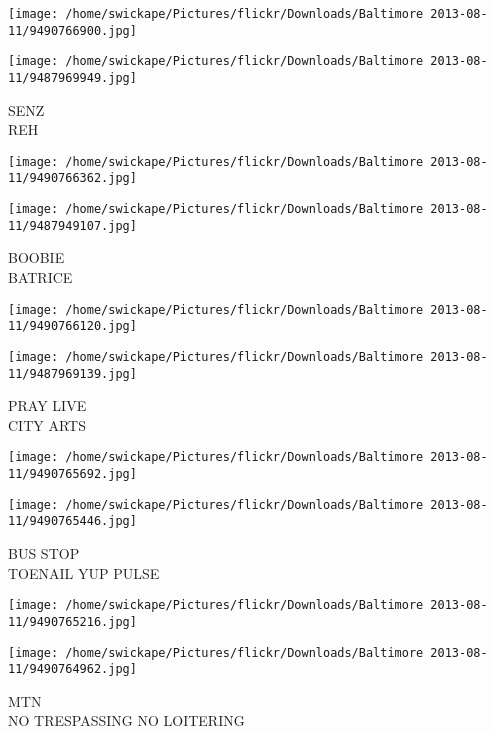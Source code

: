 \documentclass[10pt,letterpaper]{article}
\begin{document}
\texttt{[image: /home/swickape/Pictures/flickr/Downloads/Baltimore 2013-08-11/9490766900.jpg]}

\vspace{0.25in}
\texttt{[image: /home/swickape/Pictures/flickr/Downloads/Baltimore 2013-08-11/9487969949.jpg]}

SENZ\\
REH\\
\pagebreak

\texttt{[image: /home/swickape/Pictures/flickr/Downloads/Baltimore 2013-08-11/9490766362.jpg]}

\vspace{0.25in}
\texttt{[image: /home/swickape/Pictures/flickr/Downloads/Baltimore 2013-08-11/9487949107.jpg]}

BOOBIE\\
BATRICE\\
\pagebreak

\texttt{[image: /home/swickape/Pictures/flickr/Downloads/Baltimore 2013-08-11/9490766120.jpg]}

\vspace{0.25in}
\texttt{[image: /home/swickape/Pictures/flickr/Downloads/Baltimore 2013-08-11/9487969139.jpg]}

PRAY LIVE\\
CITY ARTS\\
\pagebreak

\texttt{[image: /home/swickape/Pictures/flickr/Downloads/Baltimore 2013-08-11/9490765692.jpg]}

\vspace{0.25in}
\texttt{[image: /home/swickape/Pictures/flickr/Downloads/Baltimore 2013-08-11/9490765446.jpg]}

BUS STOP\\
TOENAIL YUP PULSE\\
\pagebreak

\texttt{[image: /home/swickape/Pictures/flickr/Downloads/Baltimore 2013-08-11/9490765216.jpg]}

\vspace{0.25in}
\texttt{[image: /home/swickape/Pictures/flickr/Downloads/Baltimore 2013-08-11/9490764962.jpg]}

MTN\\
NO TRESPASSING NO LOITERING\\
\pagebreak
\end{document}
